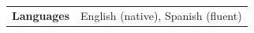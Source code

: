 \documentclass[11pt]{article}
\begin{document}
    \vspace{0.4cm}


\noindent
\begin{tabularx}{\textwidth}{@{} p{3.75cm} X @{}}
\textbf{Languages} & English (native), Spanish (fluent) \\
\end{tabularx}
\end{document}
